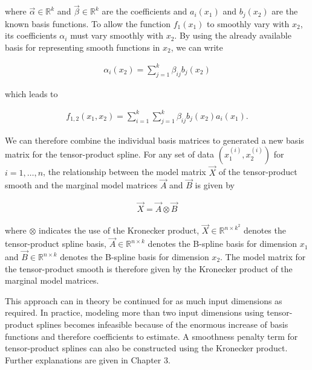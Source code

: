 \documentclass[10pt,a4paper]{report}
\begin{document}
where $\vec{\alpha} \in \mathbb{R}^{k}$ and $\vec{\beta} \in \mathbb{R}^{k}$ are the coefficients and $a_i(x_1)$ and $b_j(x_2)$ are the known basis functions. To allow the function $f_1(x_1)$ to smoothly vary with $x_2$, its coefficients $\alpha_i$ must vary smoothly with $x_2$. By using the already available basis for representing smooth functions in $x_2$, we can write

\begin{align}
	\alpha_i(x_2) = \sum_{j=1}^{k} \beta_{ij} b_j(x_2)
\end{align}

which leads to

\begin{align}
	f_{1,2}(x_1, x_2) = \sum_{i=1}^{k} \sum_{j=1}^{k} \beta_{ij} b_j(x_2) a_i(x_1).
\end{align}

We can therefore combine the individual basis matrices to generated a new basis matrix for the tensor-product spline. For any set of data $(x^{(i)}_{1}, x^{(i)}_{2})$ for $i = 1, \dots, n$, the relationship between the model matrix $\vec{X}$ of the tensor-product smooth and the marginal model matrices $\vec{A}$ and $\vec{B}$ is given by 

\begin{align}
	\vec{X} = \vec{A} \otimes \vec{B}
\end{align}

where $\otimes$ indicates the use of the Kronecker product, $\vec{X} \in \mathbb{R}^{n \times k^2}$ denotes the tensor-product spline basis, $\vec{A} \in \mathbb{R}^{n \times k}$ denotes the B-spline basis for dimension $x_1$ and $\vec{B} \in \mathbb{R}^{n \times k}$ denotes the B-spline basis for dimension $x_2$. The model matrix for the tensor-product smooth is therefore given by the Kronecker product of the marginal model matrices. \cite{wood2006GAM}  

This approach can in theory be continued for as much input dimensions as required. In practice, modeling more than two input dimensions using tensor-product splines becomes infeasible because of the enormous increase of basis functions and therefore coefficients to estimate. A smoothness penalty term for tensor-product splines can also be constructed using the Kronecker product. Further explanations are given in Chapter 3.

\end{document}
